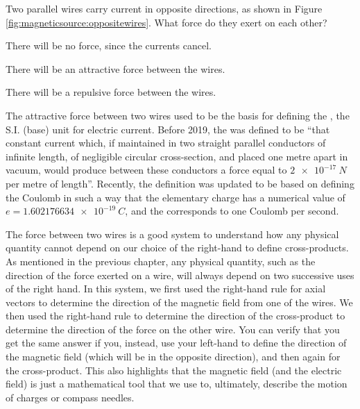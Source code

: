 \begin{checkpoint}{}
	\begin{MCquestion}{Two parallel wires carry current in opposite directions, as shown in Figure \ref{fig:magneticsource:oppositewires}. What force do they exert on each other?}
		\item There will be no force, since the currents cancel.
		\item There will be an attractive force between the wires.
		\item There will be a repulsive force between the wires. \correct
	\end{MCquestion}
\end{checkpoint}
The attractive force between two wires used to be the basis for defining the \ampere, the S.I. (base) unit for electric current. Before 2019, the \amperesp was defined to be ``that constant current which, if maintained in two straight parallel conductors of infinite length, of negligible circular cross-section, and placed one metre apart in vacuum, would produce between these conductors a force equal to $\SI{2e-17}{N}$ per metre of length''. Recently, the definition was updated to be based on defining the Coulomb in such a way that the elementary charge has a numerical value of $e=\SI{1.602176634e-19}{C}$, and the \amperesp corresponds to one Coulomb per second.

The force between two wires is a good system to understand how any physical quantity cannot depend on our choice of the right-hand to define cross-products. As mentioned in the previous chapter, any physical quantity, such as the direction of the force exerted on a wire, will always depend on two successive uses of the right hand. In this system, we first used the right-hand rule for axial vectors to determine the direction of the magnetic field from one of the wires. We then used the right-hand rule to determine the direction of the cross-product to determine the direction of the force on the other wire. You can verify that you get the same answer if you, instead, use your left-hand to define the direction of the magnetic field (which will be in the opposite direction), and then again for the cross-product. This also highlights that the magnetic field (and the electric field) is just a mathematical tool that we use to, ultimately, describe the motion of charges or compass needles.

